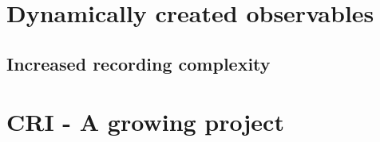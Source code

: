 \section{Dynamically created observables}

	\subsection{Increased recording complexity}
	
\section{CRI - A growing project}

